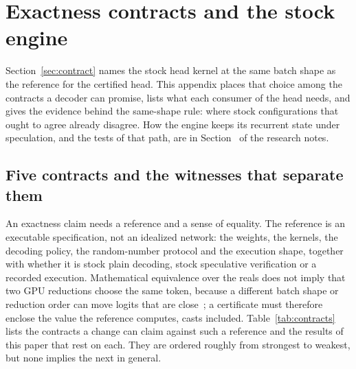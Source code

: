 \section{Exactness contracts and the stock engine}\label{app:exactness}\label{app:engine}
Section~\ref{sec:contract} names the stock head kernel at the same batch shape as the reference for the certified head. This appendix places that choice among the contracts a decoder can promise, lists what each consumer of the head needs, and gives the evidence behind the same-shape rule: where stock configurations that ought to agree already disagree. How the engine keeps its recurrent state under speculation, and the tests of that path, are in Section~ of the research notes.

\subsection{Five contracts and the witnesses that separate them}\label{app:contracts}\label{sec:contracts-p1}
An exactness claim needs a reference and a sense of equality. The reference is an executable specification, not an idealized network: the weights, the kernels, the decoding policy, the random-number protocol and the execution shape, together with whether it is stock plain decoding, stock speculative verification or a recorded execution. Mathematical equivalence over the reals does not imply that two GPU reductions choose the same token, because a different batch shape or reduction order can move logits that are close~\cite{floatguide,torchnumeric}; a certificate must therefore enclose the value the reference computes, casts included. Table~\ref{tab:contracts} lists the contracts a change can claim against such a reference and the results of this paper that rest on each. They are ordered roughly from strongest to weakest, but none implies the next in general.

